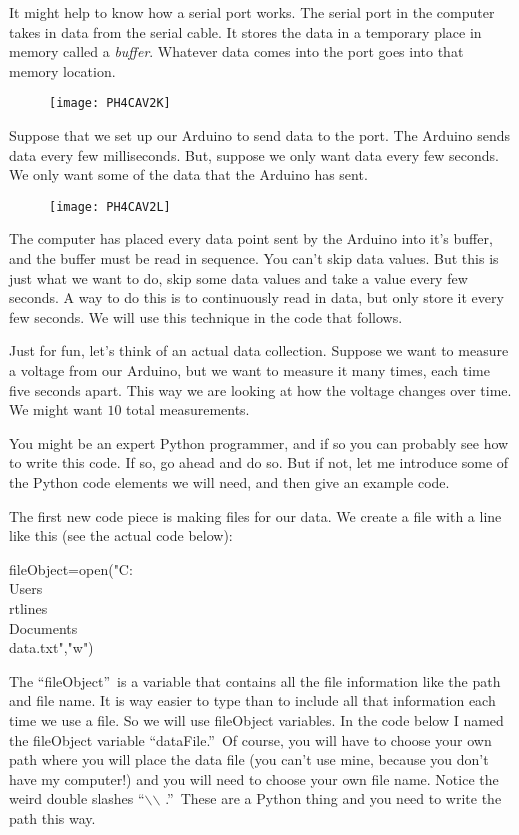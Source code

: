 It might help to know how a serial port works. The serial port in the
computer takes in data from the serial cable. It stores the data in a
temporary place in memory called a \emph{buffer}. Whatever data comes into
the port goes into that memory location. \begin{figure}[h!]
\texttt{[image: PH4CAV2K]}
\end{figure}

Suppose that we set up our Arduino to send data to the port. The Arduino
sends data every few milliseconds. But, suppose we only want data every few
seconds. We only want some of the data that the Arduino has sent. \begin{figure}[h!]
\texttt{[image: PH4CAV2L]}
\end{figure}%
The computer has placed every data point sent by the Arduino into it's
buffer, and the buffer must be read in sequence. You can't skip data values.
But this is just what we want to do, skip some data values and take a value
every few seconds. A way to do this is to continuously read in data, but
only store it every few seconds. We will use this technique in the code that
follows.

Just for fun, let's think of an actual data collection. Suppose we want to
measure a voltage from our Arduino, but we want to measure it many times,
each time five seconds apart. This way we are looking at how the voltage
changes over time. We might want $10$ total measurements.

You might be an expert Python programmer, and if so you can probably see how
to write this code. If so, go ahead and do so. But if not, let me introduce
some of the Python code elements we will need, and then give an example code.

The first new code piece is making files for our data. We create a file with
a line like this (see the actual code below):%

\begin{python}
	fileObject=open("C:\\Users\\rtlines\\Documents\\data.txt","w")	
\end{python}

The \textquotedblleft fileObject\textquotedblright\ is a variable that contains all the file information like the path and file name. It is way easier to type than to include all that information each time we use a file. So we will use fileObject variables. In the code below I named the fileObject variable \textquotedblleft dataFile.\textquotedblright\ Of course, you will have to choose your own path where you will place the data file (you can't use mine, because you don't have my computer!) and you will need to choose your own file name. Notice the weird double slashes
\textquotedblleft $\backslash$$\backslash$%
.\textquotedblright\ These are a Python thing and you need to write the path this way.

